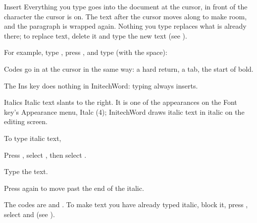 \begin{Feature}{Insert}
Everything you type goes into the document at the cursor, in front of the
character the cursor is on.  The text after the cursor moves along to make
room, and the paragraph is wrapped again.  Nothing you type replaces what is
already there; to replace text, delete it and type the new text (see
).

For example, type , press , 
and type  (with the space):
\EndReplay

\Notes
{}
Codes go in at the cursor in the same way: a hard return, a tab, the start
of bold.

The Ins key does nothing in InitechWord: typing always inserts.

\end{Feature}

\begin{Feature}{Italics}
Italic text slants to the right.  It is one of the appearances on the Font
key's Appearance menu, Italc (4); InitechWord draws italic text in italic on
the editing screen.

To type italic text,
\begin{WPSteps}
\item Press , select , then select
.
\item Type the text.
\item Press  again to move past the end of the italic.
\end{WPSteps}
The codes are \Code{[ITALC]} and \Code{[italc]}.  To make text you have
already typed italic, block it, press , select
 and  (see ).

\end{Feature}
